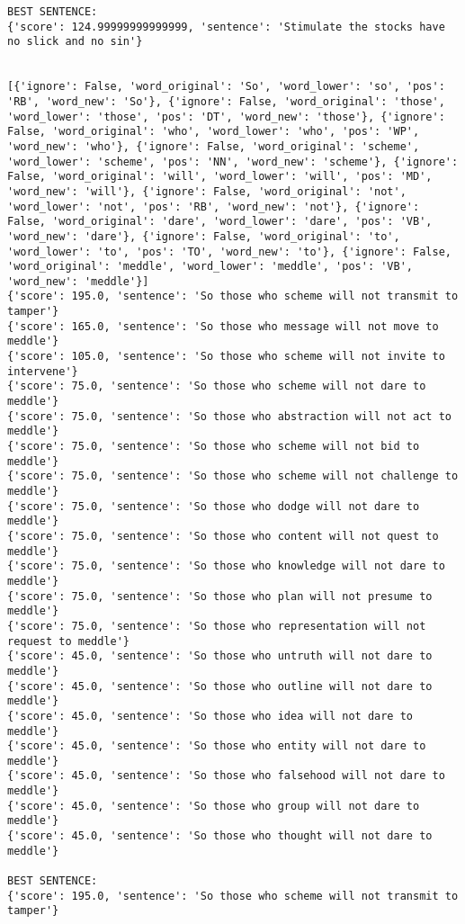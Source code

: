 \documentclass[12pt,a4paper,oneside]{book}
\begin{document}
\begin{verbatim}
BEST SENTENCE:
{'score': 124.99999999999999, 'sentence': 'Stimulate the stocks have no slick and no sin'}


[{'ignore': False, 'word_original': 'So', 'word_lower': 'so', 'pos': 'RB', 'word_new': 'So'}, {'ignore': False, 'word_original': 'those', 'word_lower': 'those', 'pos': 'DT', 'word_new': 'those'}, {'ignore': False, 'word_original': 'who', 'word_lower': 'who', 'pos': 'WP', 'word_new': 'who'}, {'ignore': False, 'word_original': 'scheme', 'word_lower': 'scheme', 'pos': 'NN', 'word_new': 'scheme'}, {'ignore': False, 'word_original': 'will', 'word_lower': 'will', 'pos': 'MD', 'word_new': 'will'}, {'ignore': False, 'word_original': 'not', 'word_lower': 'not', 'pos': 'RB', 'word_new': 'not'}, {'ignore': False, 'word_original': 'dare', 'word_lower': 'dare', 'pos': 'VB', 'word_new': 'dare'}, {'ignore': False, 'word_original': 'to', 'word_lower': 'to', 'pos': 'TO', 'word_new': 'to'}, {'ignore': False, 'word_original': 'meddle', 'word_lower': 'meddle', 'pos': 'VB', 'word_new': 'meddle'}]
{'score': 195.0, 'sentence': 'So those who scheme will not transmit to tamper'}
{'score': 165.0, 'sentence': 'So those who message will not move to meddle'}
{'score': 105.0, 'sentence': 'So those who scheme will not invite to intervene'}
{'score': 75.0, 'sentence': 'So those who scheme will not dare to meddle'}
{'score': 75.0, 'sentence': 'So those who abstraction will not act to meddle'}
{'score': 75.0, 'sentence': 'So those who scheme will not bid to meddle'}
{'score': 75.0, 'sentence': 'So those who scheme will not challenge to meddle'}
{'score': 75.0, 'sentence': 'So those who dodge will not dare to meddle'}
{'score': 75.0, 'sentence': 'So those who content will not quest to meddle'}
{'score': 75.0, 'sentence': 'So those who knowledge will not dare to meddle'}
{'score': 75.0, 'sentence': 'So those who plan will not presume to meddle'}
{'score': 75.0, 'sentence': 'So those who representation will not request to meddle'}
{'score': 45.0, 'sentence': 'So those who untruth will not dare to meddle'}
{'score': 45.0, 'sentence': 'So those who outline will not dare to meddle'}
{'score': 45.0, 'sentence': 'So those who idea will not dare to meddle'}
{'score': 45.0, 'sentence': 'So those who entity will not dare to meddle'}
{'score': 45.0, 'sentence': 'So those who falsehood will not dare to meddle'}
{'score': 45.0, 'sentence': 'So those who group will not dare to meddle'}
{'score': 45.0, 'sentence': 'So those who thought will not dare to meddle'}

BEST SENTENCE:
{'score': 195.0, 'sentence': 'So those who scheme will not transmit to tamper'}



\end{verbatim}
\end{document}
